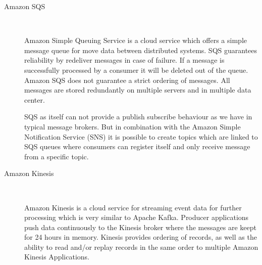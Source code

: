 \begin{description}
    \item [Amazon SQS] \hfill \\
    {
    Amazon Simple Queuing Service is a cloud service which offers a simple
    message queue for move data between distributed systems. SQS guarantees
    reliability by redeliver messages in case of failure. If a message is
    successfully processed by a consumer it will be deleted out of the queue.
    Amazon SQS does not guarantee a strict ordering of messages. All messages
    are stored redundantly on multiple servers and in multiple data center.
    \cite{amazonSQS} \cite{amazonSQSFaq} 

    SQS as itself can not provide a publish subscribe behaviour as we
    have in typical message brokers. But in combination with the Amazon
    Simple  Notification Service (SNS) it
    is possible to create topics which are linked to SQS queues where
    consumers can register itself and only receive message from a specific
    topic. \cite{amazonSqsPubSub}
     }
    \item [Amazon Kinesis] \hfill \\
    { 
    Amazon Kinesis is a cloud service for streaming event
    data for further processing which is very similar to Apache Kafka. Producer
    applications push data continuously to the Kinesis broker where the messages
    are keept for 24 hours in memory. Kinesis provides ordering of records, as
    well as the ability to read and/or replay records in the same order to
    multiple Amazon Kinesis Applications.
    \cite{amazonKinesis} \cite{amazonKinesisFAQ} 
    
}
\end{description}
